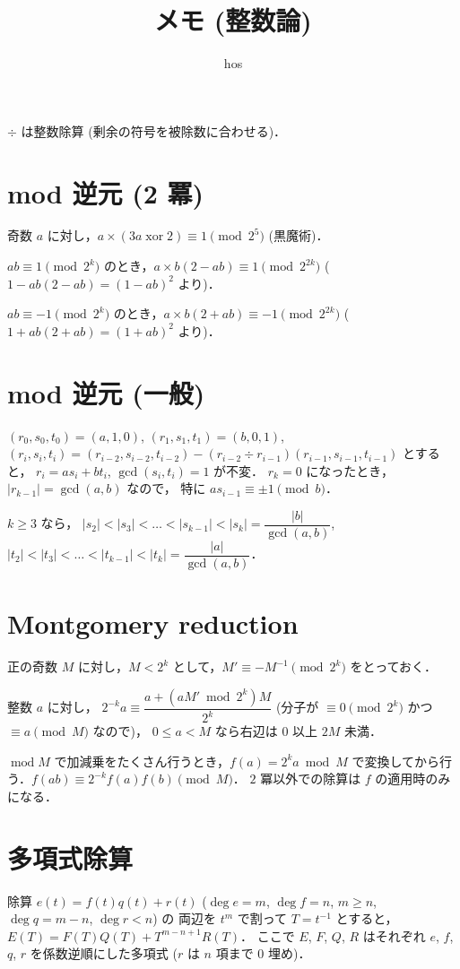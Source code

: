\documentclass{jsarticle}
\title{メモ (整数論)}
\author{hos}
\DeclareMathOperator{\Mod}{mod}
\DeclareMathOperator{\xor}{xor}
\begin{document}
\maketitle

$\div$ は整数除算 (剰余の符号を被除数に合わせる)．

\section{mod 逆元 (2 冪)}
奇数 $a$ に対し，$a \times (3a \xor 2) \equiv 1 \pmod{2^5}$ (黒魔術)．

$a b \equiv 1 \pmod{2^k}$ のとき，$a \times b (2 - a b) \equiv 1 \pmod{2^{2k}}$ ($1 - a b (2 - a b) = (1 - a b)^2$ より)．

$a b \equiv -1 \pmod{2^k}$ のとき，$a \times b (2 + a b) \equiv -1 \pmod{2^{2k}}$ ($1 + a b (2 + a b) = (1 + a b)^2$ より)．

\section{mod 逆元 (一般)}
$(r_0, s_0, t_0) = (a, 1, 0)$, 
$(r_1, s_1, t_1) = (b, 0, 1)$, 
$(r_i, s_i, t_i) = (r_{i-2}, s_{i-2}, t_{i-2}) - (r_{i-2} \div r_{i-1}) (r_{i-1}, s_{i-1}, t_{i-1})$ とすると，
$r_i = a s_i + b t_i$, $\gcd(s_i, t_i) = 1$ が不変．
$r_k = 0$ になったとき，$\lvert r_{k-1} \rvert = \gcd(a, b)$ なので，
特に $a s_{i-1} \equiv \pm 1 \pmod{b}$．

$k \ge 3$ なら，
$|s_2| < |s_3| < \dots < |s_{k-1}| < |s_k| = \dfrac{\lvert b \rvert}{\gcd(a, b)}$, 
$|t_2| < |t_3| < \dots < |t_{k-1}| < |t_k| = \dfrac{\lvert a \rvert}{\gcd(a, b)}$．

\section{Montgomery reduction}
正の奇数 $M$ に対し，$M < 2^k$ として，$M' \equiv -M^{-1} \pmod{2^k}$ をとっておく．

整数 $a$ に対し，
$2^{-k} a \equiv \dfrac{a + (a M' \bmod 2^k) M}{2^k}$ (分子が $\equiv 0 \pmod{2^k}$ かつ $\equiv a \pmod{M}$ なので)，
$0 \le a < M$ なら右辺は $0$ 以上 $2 M$ 未満．

$\Mod M$ で加減乗をたくさん行うとき，$f(a) = 2^k a \bmod M$ で変換してから行う．$f(a b) \equiv 2^{-k} f(a) f(b) \pmod{M}$．
$2$ 冪以外での除算は $f$ の適用時のみになる．

\section{多項式除算}
除算 $e(t) = f(t) q(t) + r(t)$ ($\deg e = m$, $\deg f = n$, $m \ge n$, $\deg q = m - n$, $\deg r < n$) の
両辺を $t^m$ で割って $T = t^{-1}$ とすると，
$E(T) = F(T) Q(T) + T^{m-n+1} R(T)$．
ここで $E$, $F$, $Q$, $R$ はそれぞれ $e$, $f$, $q$, $r$ を係数逆順にした多項式 ($r$ は $n$ 項まで $0$ 埋め)．
\end{document}
